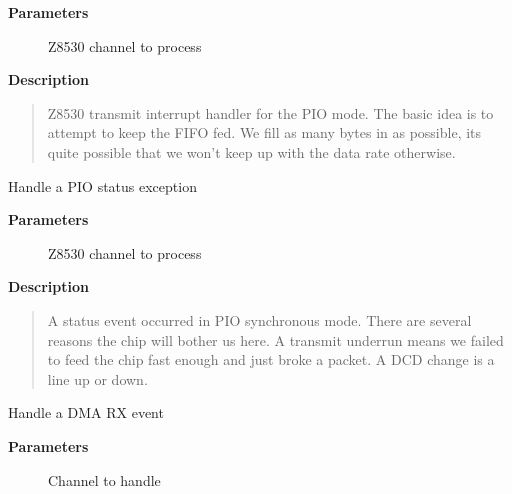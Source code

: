 \documentclass[a4paper,8pt,english]{sphinxmanual}
\begin{document}
\textbf{Parameters}
\begin{description}
\item[{}] \leavevmode
Z8530 channel to process

\end{description}

\textbf{Description}
\begin{quote}

Z8530 transmit interrupt handler for the PIO mode. The basic
idea is to attempt to keep the FIFO fed. We fill as many bytes
in as possible, its quite possible that we won't keep up with the
data rate otherwise.
\end{quote}

\begin{fulllineitems}
\label{networking/z8530book:c.z8530_status}
Handle a PIO status exception

\end{fulllineitems}


\textbf{Parameters}
\begin{description}
\item[{}] \leavevmode
Z8530 channel to process

\end{description}

\textbf{Description}
\begin{quote}

A status event occurred in PIO synchronous mode. There are several
reasons the chip will bother us here. A transmit underrun means we
failed to feed the chip fast enough and just broke a packet. A DCD
change is a line up or down.
\end{quote}

\begin{fulllineitems}
\label{networking/z8530book:c.z8530_dma_rx}
Handle a DMA RX event

\end{fulllineitems}


\textbf{Parameters}
\begin{description}
\item[{}] \leavevmode
Channel to handle

\end{description}
\end{document}
